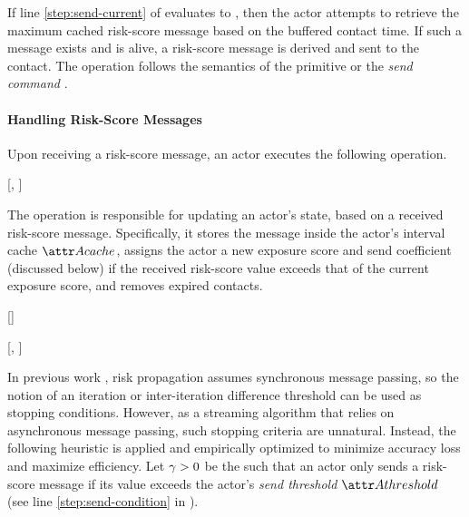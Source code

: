 If line \ref{step:send-current} of \cSendCurrentOrCached[] evaluates to \false, then the actor attempts to retrieve the maximum cached risk-score message based on the buffered contact time. If such a message exists and is alive, a risk-score message is derived and sent to the contact. The \cSend[] operation follows the semantics of the  primitive \cite{AghaThesis1985, Agha1990} or the \emph{send command} \cite{Agha1985}.

\paragraph{Handling Risk-Score Messages}

Upon receiving a risk-score message, an actor executes the following
operation.
%
\begin{function}{\nHandleScoreMessage}[\vActor, \vScore]
\mState{\cCacheInsert[\aActorCache, \vScore]}
\mIf{\aScoreValue > \aActorScoreValue}
	\mState{\aActorScore \assign \vScore}
		\mState{\cStartScoreRefreshTimer[\vActor]}
	\EndIf
\EndIf
\mState{\cPropagate[\vActor, \vScore]}
\end{function}
%
The  operation is responsible for updating an actor's state, based on a received risk-score message. Specifically, it stores the message inside the actor's interval cache $\aActorCache$, assigns the actor a new exposure score and send coefficient (discussed below) if the received risk-score value exceeds that of the current exposure score, and removes expired contacts.
%
\begin{function}{\nStartScoreRefreshTimer}[\vActor]
\mState{\cStartTimer[\vTimer, \cScoreTtl[\aActorScore]]}
\end{function}
\begin{function}{\nHandleScoreRefreshTimer}[\vActor, \vTimer]
\mState{\vScore \assign \cCacheMax[\cGetTime]}
\mIf{\vScore \equals \nil}
	\mState{\vScore \assign \cDefaultScore[\vActor]}
\EndIf
\mState{\aActorScore \assign \vScore}
\mIf{\vScore \notEquals \cDefaultScore[\vActor]}
	\mState{\cStartScoreRefreshTimer[\vActor]}
\EndIf
\end{function}
%
In previous work \cite{Ayday2021}, risk propagation assumes synchronous message passing, so the notion of an iteration or inter-iteration difference threshold can be used as stopping conditions. However, as a streaming algorithm that relies on asynchronous message passing, such stopping criteria are unnatural. Instead, the following heuristic is applied and empirically optimized to minimize accuracy loss and maximize efficiency. Let $\gamma > 0$ be the  such that an actor only sends a risk-score message if its value exceeds the actor's \emph{send threshold} $\aThreshold{\vActor}$ (see line \ref{step:send-condition} in \cPropagate).

